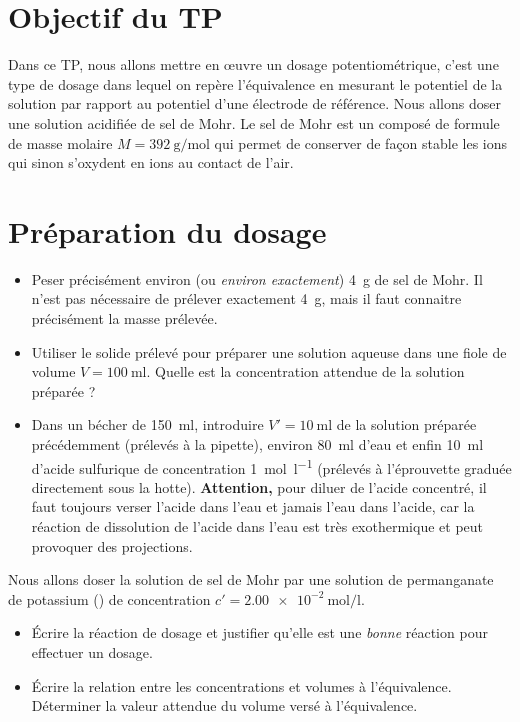 \documentclass{tp}
\begin{document}


\section{Objectif du TP}
 Dans ce TP, nous allons mettre en \oe{}uvre un dosage potentiométrique, c'est une type de dosage dans lequel on repère l'équivalence en mesurant le potentiel de la solution par rapport au potentiel d'une électrode de référence. Nous allons doser une solution acidifiée de sel de Mohr. Le sel de Mohr est un composé de formule  de masse molaire $M=\SI{392}{\gram\per\mole}$ qui permet de conserver de façon stable les ions  qui sinon s'oxydent en ions  au contact de l'air.

\section{Préparation du dosage}%
\label{sec:preparation_du_dosage}

\begin{itemize}
  \item Peser précisément environ (ou \textit{environ exactement}) \SI{4}{\gram} de sel de Mohr. Il n'est pas nécessaire de prélever exactement \SI{4}{\gram}, mais il faut connaitre précisément la masse prélevée.

  \item Utiliser le solide prélevé pour préparer une solution aqueuse dans une fiole de volume $V=\SI{100}{\milli\litre}$. Quelle est la concentration attendue de la solution préparée ?

  \item Dans un bécher de \SI{150}{\milli\litre}, introduire $V'=\SI{10}{\milli\litre}$ de la solution préparée précédemment (prélevés à la pipette), environ \SI{80}{\milli\litre} d'eau et enfin \SI{10}{\milli\litre} d'acide sulfurique de concentration \SI{1}{\mole\per\litre} (prélevés à l'éprouvette graduée directement sous la hotte). \textbf{Attention, } pour diluer de l'acide concentré, il faut toujours verser l'acide dans l'eau et jamais l'eau dans l'acide, car la réaction de dissolution de l'acide dans l'eau est très exothermique et peut provoquer des projections. 
\end{itemize}
Nous allons doser la solution de sel de Mohr par une solution de permanganate de potassium () de concentration $c'=\SI{2.00e-2}{\mole\per\litre}$. 
\begin{itemize}
  \item Écrire la réaction de dosage et justifier qu'elle est une \emph{bonne} réaction pour effectuer un dosage.
  \item Écrire la relation entre les concentrations et volumes à l'équivalence. Déterminer la valeur attendue du volume versé à l'équivalence.
\end{itemize}
\end{document}
